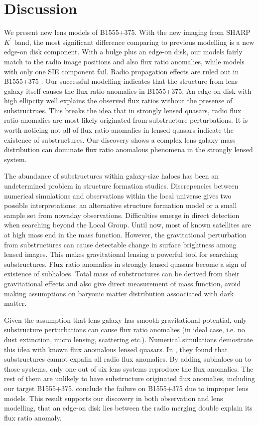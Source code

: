 \documentclass[useAMS,usenatbib]{mn2e}
\begin{document}
\section{Discussion}

We present new lens models of B1555+375. With the new imaging from SHARP $K^{\prime}$ band, the most significant difference comparing to previous modelling is a new edge-on disk component. With a bulge plus an edge-on disk, our models fairly match to the radio image positions and also flux ratio anomalies, while models with only one SIE component \citep{Marlow,Xu14} fail. Radio propagation effects are ruled out in B1555+375 \citep{K03,KD04}. Our successful modelling indicates that the structure from lens galaxy itself causes the flux ratio anomalies in B1555+375. An edge-on disk with high ellipcity well explains the observed flux ratios without the presense of substructrues. This breaks the idea that in strongly lensed quasars, radio flux ratio anomalies are most likely originated from substructure perturbations. It is worth noticing not all of flux ratio anomalies in lensed quasars indicate the existence of substructures. Our discovery shows a complex lens galaxy mass distribution can dominate flux ratio anomalous phenomena in the strongly lensed system. 

The abundance of substructures within galaxy-size haloes has been an undetermined problem in structure formation studies. Discrepencies between numerical simulations and observations within the local universe gives two possible interpretations: an alternative structure formation model or a small sample set from nowaday observations. Difficulties emerge in direct detection when searching beyond the Local Group. Until now, most of known satellites are at high mass end in the mass function. However, the gravitational perturbation from substructures can cause detectable change in surface brightness among lensed images. This makes gravitational lensing a powerful tool for searching substructures. Flux ratio anomalies in strongly lensed quasars become a sign of existence of subhaloes. Total mass of substructures can be derived from their gravitational effects and also give direct measurement of mass function, avoid making assumptions on baryonic matter distribution assoociated with dark matter.

Given the assumption that lens galaxy has smooth gravitational potential, only substructure perturbations can cause flux ratio anomalies (in ideal case, i.e. no dust extinction, micro lensing, scattering etc.). Numerical simulations demostrate this idea with known flux anomalous lensed quasars. In \citet{Xu14}, they found that substructures cannot expalin all radio flux anomalies. By adding subhaloes on to those systems, only one out of six lens systems reproduce the flux anomalies. The rest of them are unlikely to have substructure originated flux anomalies, including our target B1555+375. \citet{Xu14} conclude the failure on B1555+375 due to improper lens models. This result supports our discovery in both observation and lens modelling, that an edge-on disk lies  between the radio merging double explain its flux ratio anomaly. 
\end{document}
